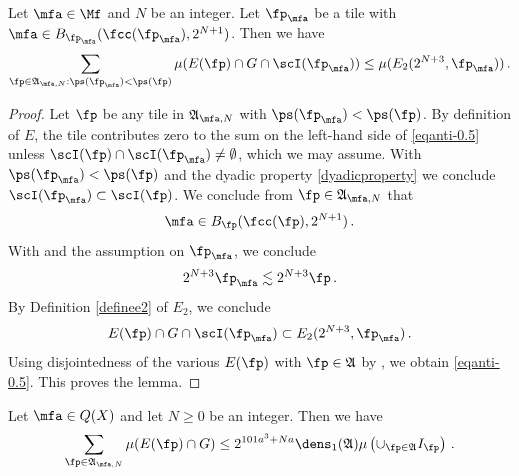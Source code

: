 \begin{lemma}\label{local-antichain-density}
\leanok
{}
Let $\mfa\in\Mf$ and {$N$} be
an integer. Let $\fp_{\mfa}$ be a tile with $\mfa\in B_{\fp_{\mfa}}(\fcc(\fp_{\mfa}), 2^{N+1})$.
Then we have
\begin{equation}\label{eqanti-0.5}
    \sum_{\fp\in\mathfrak{A}_{\mfa,N}: \ps(\fp_{\mfa})<\ps(\fp)}\mu(E(\fp)\cap G \cap \scI(\fp_{\mfa}))
    \le \mu (E_2(2^{N+3},\fp_{\mfa}))
 \, .
\end{equation}



\end{lemma}

\begin{proof}
\leanok

Let $\fp$ be any tile in $\mathfrak{A}_{\mfa,N}$ with $\ps(\fp_{\mfa})<\ps(\fp)$. By definition of
$E$, the tile contributes zero to the sum on the left-hand side of \eqref{eqanti-0.5} unless
 $\scI(\fp)\cap \scI(\fp_{\mfa}) \neq \emptyset$, which we may assume. With $\ps(\fp_{\mfa})<\ps(\fp)$
and the dyadic property
\eqref{dyadicproperty} we conclude $\scI(\fp_{\mfa})\subset \scI(\fp)$.
We conclude from $\fp \in \mathfrak{A}_{\mfa,N}$ that
\begin{equation}
    \mfa \in B_\fp(\fcc(\fp), 2^{N+1})\, .
\end{equation}
With  and the assumption on $\fp_\mfa$, we conclude
\begin{equation}
    2^{N+3}\fp_{\mfa} \lesssim 2^{N+3}\fp \, .
\end{equation}
By Definition \eqref{definee2} of $E_2$, we conclude
\begin{equation}
    E(\fp)\cap G \cap \scI(\fp_{\mfa}) \subset E_2(2^{N+3},\fp_{\mfa})\, .
\end{equation}
Using disjointedness of the various $E(\fp)$ with $\fp\in \mathfrak{A}$ by , we obtain \eqref{eqanti-0.5}.
This proves the lemma.
\end{proof}
\begin{lemma}
\label{global-antichain-density}
\leanok
{}
Let $\mfa\in Q(X)$ and let $N\ge 0$ be
an integer. Then we have
\begin{equation}\label{eqanti00}
    \sum_{\fp\in\mathfrak{A}_{\mfa,N}}\mu(E(\fp)\cap G)
    \le
 2^{101a^3+Na}\dens_1(\mathfrak{A})\mu\left(\cup_{\fp\in\mathfrak{A}}I_{\fp}\right)\, .
\end{equation}
\end{lemma}



